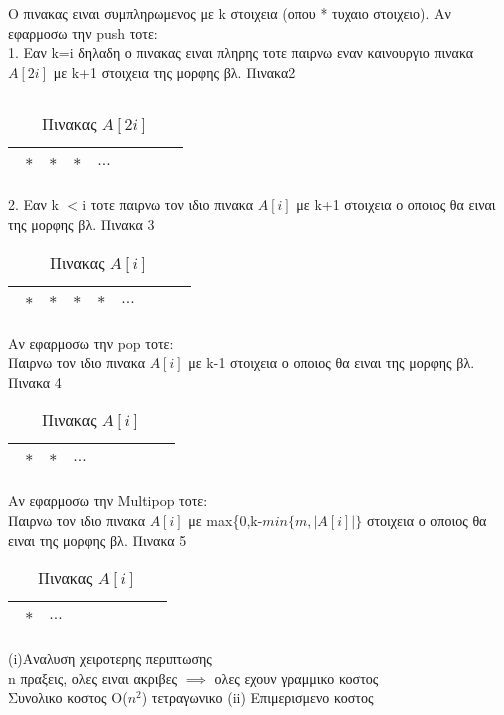\documentclass[12pt]{article}
\begin{document}
Ο πινακας ειναι συμπληρωμενος με k στοιχεια (οπου * τυχαιο στοιχειο).
Αν εφαρμοσω την push τοτε:$$ $$
1. Εαν k=i δηλαδη ο πινακας ειναι πληρης τοτε παιρνω εναν καινουργιο πινακα $A[2i]$ με k+1 στοιχεια  της μορφης βλ. Πινακα2$$ $$

$$ $$
\begin{table}[H]
\begin{center}
\caption{Πινακας $A[2i]$}
\begin{tabular}{|l|c|r|c|l|l|c|r|}
\hline
\ $*$ & $*$ & $*$ & $...$ & $  $ & $  $ & $  $\\
\hline
\end{tabular}
\end{center}
\end{table}
2. Εαν k $<$i τοτε παιρνω τον ιδιο πινακα $A[i]$ με k+1 στοιχεια ο οποιος θα ειναι της μορφης βλ. Πινακα 3
\begin{table}[H]
\begin{center}
\caption{Πινακας $A[i]$}
\begin{tabular}{|l|c|r|c|l|l|c|r|}
\hline
\ $*$ & $*$ & $*$ & $*$ & $...$ & $ $\\
\hline
\end{tabular}
\end{center}
\end{table}       
$$ $$ $$ $$ 
Αν εφαρμοσω την pop τοτε:$$ $$
Παιρνω τον ιδιο πινακα $A[i]$ με k-1 στοιχεια ο οποιος θα ειναι της μορφης βλ. Πινακα 4
$$ $$
\begin{table}[H]
\begin{center}
\caption{Πινακας $A[i]$}
\begin{tabular}{|l|c|r|c|l|l|c|r|}
\hline
\ $*$ & $*$ & $...$ & $  $ & $  $ & $  $\\
\hline
\end{tabular}
\end{center}
\end{table}
Αν εφαρμοσω την Multipop τοτε:$$ $$
Παιρνω τον ιδιο πινακα $A[i]$ με max\{0,k-$min\{m,|A[i]|\}$ στοιχεια ο οποιος θα ειναι της μορφης βλ. Πινακα 5
$$ $$
\begin{table}[H]
\begin{center}
\caption{Πινακας $A[i]$}
\begin{tabular}{|l|c|r|c|l|l|c|r|}
\hline
\ $*$ & $...$ & $ $ & $  $ & $  $ & $  $\\
\hline
\end{tabular}
\end{center}
\end{table}
$$ $$
 (i)Αναλυση χειροτερης περιπτωσης$$ $$
 n πραξεις, ολες ειναι ακριβες $\implies$ ολες εχουν γραμμικο κοστος$$ $$
 Συνολικο κοστος Ο($n^2$) τετραγωνικο
 (ii) Επιμερισμενο κοστος $$ $$ $$ $$ 
 
\end{document}
